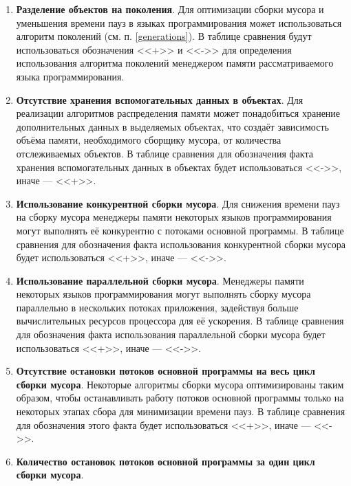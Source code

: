 \begin{enumerate}[label*=\arabic*.]
	\item \textbf{Разделение объектов на поколения}. \newline
	Для оптимизации сборки мусора и уменьшения времени пауз в языках программирования может использоваться алгоритм поколений (см. п. \ref{generations}). В таблице сравнения будут использоваться обозначения <<+>> и <<->> для определения использования алгоритма поколений менеджером памяти рассматриваемого языка программирования.
	
	\item \textbf{Отсутствие хранения вспомогательных данных в объектах}. \newline
	Для реализации алгоритмов распределения памяти может понадобиться хранение дополнительных данных в выделяемых объектах, что создаёт зависимость объёма памяти, необходимого сборщику мусора, от количества отслеживаемых объектов. В таблице сравнения для обозначения факта хранения вспомогательных данных в объектах будет использоваться <<->>, иначе --- <<+>>.
	
	\item \textbf{Использование конкурентной сборки мусора}. \newline
	Для снижения времени пауз на сборку мусора менеджеры памяти некоторых языков программирования могут выполнять её конкурентно с потоками основной программы. В таблице сравнения для обозначения факта использования конкурентной сборки мусора будет использоваться <<+>>, иначе --- <<->>.
	
	\item \textbf{Использование параллельной сборки мусора}. \newline
	Менеджеры памяти некоторых языков программирования могут выполнять сборку мусора параллельно в нескольких потоках приложения, задействуя больше вычислительных ресурсов процессора для её ускорения. В таблице сравнения для обозначения факта использования параллельной сборки мусора будет использоваться <<+>>, иначе --- <<->>.
	
	\item \textbf{Отсутствие остановки потоков основной программы на весь цикл сборки мусора}. \newline
	Некоторые алгоритмы сборки мусора оптимизированы таким образом, чтобы останавливать работу потоков основной программы только на некоторых этапах сбора для минимизации времени пауз. В таблице сравнения для обозначения этого факта будет использоваться <<+>>, иначе --- <<->>.
	
	\item \textbf{Количество остановок потоков основной программы за один цикл сборки мусора}.
\end{enumerate}

